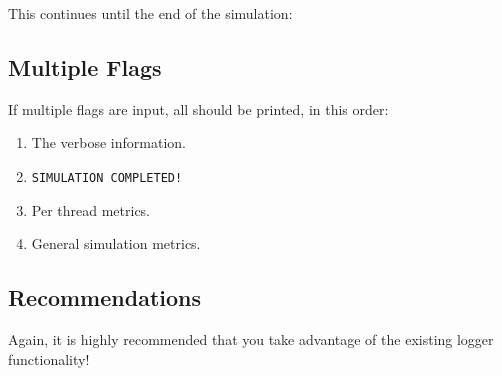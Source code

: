 \documentclass[main.tex]{subfiles}
\begin{document}


This continues until the end of the simulation:



\subsection{Multiple Flags}

If multiple flags are input, all should be printed, in this order:
\begin{enumerate}
    \item The verbose information.
    \item \texttt{SIMULATION COMPLETED!}
    \item Per thread metrics.
    \item General simulation metrics.
\end{enumerate}

\subsection{Recommendations}

Again, it is highly recommended that you take advantage of the existing logger functionality!
\end{document}
